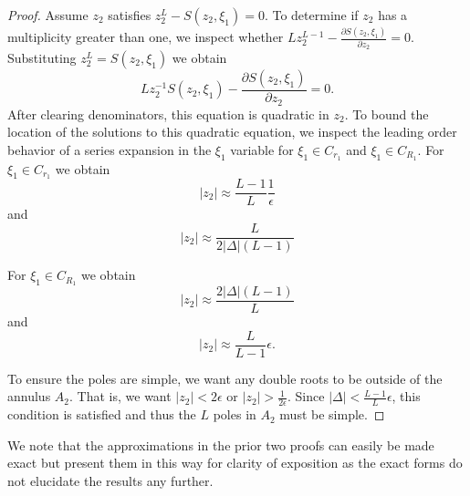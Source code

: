 \documentclass[a4paper,11pt]{article}
\theoremstyle{definition}
\begin{document}
\begin{proof}
    Assume $z_2$ satisfies  $z_2^L-S(z_2,\xi_1)=0$. To determine if $z_2$ has a multiplicity greater than one, we inspect whether $Lz_2^{L-1}-\frac{\partial S(z_2,\xi_1)}{\partial z_2}=0$. Substituting $z_2^L=S(z_2,\xi_1)$ we obtain 
    \begin{equation}
        Lz_2^{-1}S(z_2,\xi_1)-\frac{\partial S(z_2,\xi_1)}{\partial z_2} = 0. 
    \end{equation}
     After clearing denominators, this equation is quadratic in $z_2$. 
    To bound the location of the solutions to this quadratic equation, we inspect the leading order behavior of a series expansion in the $\xi_1$ variable for $\xi_1\in C_{r_1}$ and $\xi_1\in C_{R_1}$. For $\xi_1 \in C_{r_1}$ we obtain 
    \begin{equation}
       |z_2| \approx \frac{L-1}{L}\frac{1}{\epsilon} 
    \end{equation}
    and
    \begin{equation}
      |z_2| \approx \frac{L}{2|\Delta|(L-1)} 
    \end{equation}

    For $\xi_1\in C_{R_1}$ we obtain 
    \begin{equation}
        |z_2| \approx \frac{2|\Delta|(L-1)}{L} 
    \end{equation}
    and 
    \begin{equation}
        |z_2| \approx \frac{L}{L-1}\epsilon.
    \end{equation}
    
To ensure the poles are simple, we want any double roots to be outside of the annulus $A_2$. That is, we want $|z_2|< 2\epsilon$ or $|z_2|> \frac{1}{2\epsilon}$. Since $|\Delta|< \frac{L-1}{L}\epsilon$, this condition is satisfied and thus the $L$ poles in $A_2$ must be simple. 

\end{proof}

We note that the approximations in the prior two proofs can easily be made exact but present them in this way for clarity of exposition as the exact forms do not elucidate the results any further. 
\end{document}
